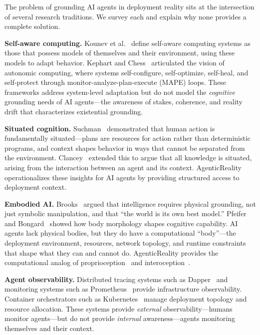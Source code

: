\documentclass[10pt, twocolumn]{article}
\begin{document}
The problem of grounding AI agents in deployment reality sits at the intersection of several research traditions. We survey each and explain why none provides a complete solution.

\textbf{Self-aware computing.} Kounev et al.~\cite{kounev2017selfaware} define self-aware computing systems as those that possess models of themselves and their environment, using these models to adapt behavior. Kephart and Chess~\cite{kephart2003vision} articulated the vision of autonomic computing, where systems self-configure, self-optimize, self-heal, and self-protect through monitor-analyze-plan-execute (MAPE) loops. These frameworks address system-level adaptation but do not model the \emph{cognitive} grounding needs of AI agents---the awareness of stakes, coherence, and reality drift that characterizes existential grounding.

\textbf{Situated cognition.} Suchman~\cite{suchman1987plans} demonstrated that human action is fundamentally situated---plans are resources for action rather than deterministic programs, and context shapes behavior in ways that cannot be separated from the environment. Clancey~\cite{clancey1997situated} extended this to argue that all knowledge is situated, arising from the interaction between an agent and its context. AgenticReality operationalizes these insights for AI agents by providing structured access to deployment context.

\textbf{Embodied AI.} Brooks~\cite{brooks1991intelligence} argued that intelligence requires physical grounding, not just symbolic manipulation, and that ``the world is its own best model.'' Pfeifer and Bongard~\cite{pfeifer2007understanding} showed how body morphology shapes cognitive capability. AI agents lack physical bodies, but they do have a computational ``body''---the deployment environment, resources, network topology, and runtime constraints that shape what they can and cannot do. AgenticReality provides the computational analog of proprioception~\cite{proske2012proprioceptive} and interoception~\cite{craig2002interoception}.

\textbf{Agent observability.} Distributed tracing systems such as Dapper~\cite{sigelman2010dapper} and monitoring systems such as Prometheus~\cite{prometheus2024} provide infrastructure observability. Container orchestrators such as Kubernetes~\cite{kubernetes2024} manage deployment topology and resource allocation. These systems provide \emph{external} observability---humans monitor agents---but do not provide \emph{internal} awareness---agents monitoring themselves and their context.
\end{document}

